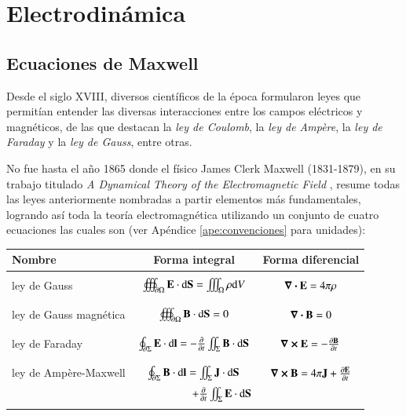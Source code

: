 \chapter{Electrodinámica}
\label{cap:1}
\newpage

\section{Ecuaciones de Maxwell}

Desde el siglo XVIII, diversos científicos de la época formularon leyes que permitían entender las diversas interacciones entre los campos eléctricos y magnéticos, de las que destacan la \textit{ley de Coulomb}, la \textit{ley de Ampère}, la \textit{ley de Faraday} y la \textit{ley de Gauss}, entre otras. 

No fue hasta el año 1865 donde el físico James Clerk Maxwell (1831-1879), en su trabajo titulado \textit{A Dynamical Theory of the Electromagnetic Field} \cite{Maxwell}, resume todas las leyes anteriormente nombradas a partir elementos más fundamentales, logrando así toda la teoría electromagnética utilizando un conjunto de cuatro ecuaciones las cuales son (ver Apéndice \ref{ape:convenciones} para unidades):
\begin{center}
\begin{tabular}{l|c|c}
Nombre & Forma integral & Forma diferencial \\
\hline \hline
 & & \\
ley de Gauss & $\oiiint_{\partial \Omega} \vb{E} \cdot \mathrm{d}\vb{S} = \iiint_{\Omega} \rho \mathrm{d}V $ & $\div{\vb{E}} = 4\pi \rho$ \\
 & & \\
\hline
 & & \\
ley de Gauss magnética & $\oiiint_{\partial \Omega} \vb{B} \cdot \mathrm{d}\vb{S} = 0 $ & $\div{\vb{B}} = 0$ \\
 & & \\
\hline
 & & \\
ley de Faraday & $\oint_{\partial \Sigma} \vb{E} \cdot \mathrm{d} \vb{l} = - \pdv{}{t} \iint_{\Sigma} \vb{B} \cdot \mathrm{d} \vb{S}$ & $\curl{\vb{E}} = - \pdv{\vb{B}}{t}$ \\
 & & \\
\hline
 & & \\
ley de Ampère-Maxwell & $\oint_{\partial \Sigma} \vb{B} \cdot \mathrm{d}\vb{l} = \iint_{\Sigma} \vb{J} \cdot \mathrm{d} \vb{S} $ & $\curl{\vb{B}} = 4 \pi \vb{J} +  \pdv{\vb{E}}{t}$\\
 & $\qquad \qquad \quad + \pdv{}{t} \iint_{\Sigma} \vb{E} \cdot \mathrm{d} \vb{S}$ & \\
  & & 
\end{tabular} 
\end{center}

